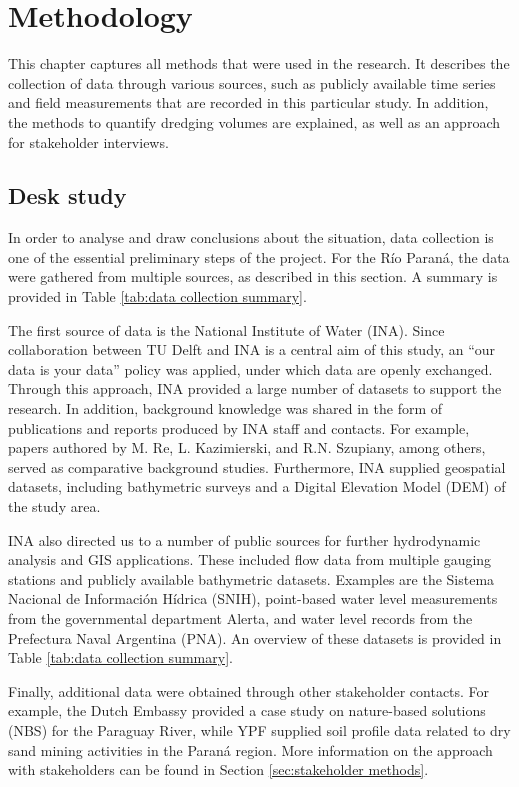 \chapter{Methodology}
\label{chap:methodology}

This chapter captures all methods that were used in the research. It describes the collection of data through various sources, such as publicly available time series and field measurements that are recorded in this particular study. In addition, the methods to quantify dredging volumes are explained, as well as an approach for stakeholder interviews.

\section{Desk study}
\label{sec:desk study}
In order to analyse and draw conclusions about the situation, data collection is one of the essential preliminary steps of the project. For the Río Paraná, the data were gathered from multiple sources, as described in this section. A summary is provided in Table \ref{tab:data collection summary}.

The first source of data is the National Institute of Water (INA). Since collaboration between TU Delft and INA is a central aim of this study, an “our data is your data” policy was applied, under which data are openly exchanged. Through this approach, INA provided a large number of datasets to support the research. In addition, background knowledge was shared in the form of publications and reports produced by INA staff and contacts. For example, papers authored by M. Re, L. Kazimierski, and R.N. Szupiany, among others, served as comparative background studies. Furthermore, INA supplied geospatial datasets, including bathymetric surveys and a Digital Elevation Model (DEM) of the study area.

INA also directed us to a number of public sources for further hydrodynamic analysis and GIS applications. These included flow data from multiple gauging stations and publicly available bathymetric datasets. Examples are the Sistema Nacional de Información Hídrica (SNIH), point-based water level measurements from the governmental department Alerta, and water level records from the Prefectura Naval Argentina (PNA). An overview of these datasets is provided in Table \ref{tab:data collection summary}.

Finally, additional data were obtained through other stakeholder contacts. For example, the Dutch Embassy provided a case study on nature-based solutions (NBS) for the Paraguay River, while YPF supplied soil profile data related to dry sand mining activities in the Paraná region. More information on the approach with stakeholders can be found in Section \ref{sec:stakeholder methods}.

